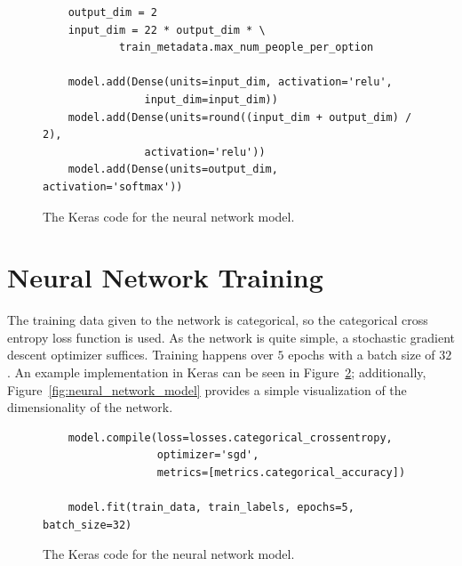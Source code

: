 \documentclass[]{report}
\begin{document}
\begin{figure}[h]
    \centering
    \begin{verbatim}
    output_dim = 2
    input_dim = 22 * output_dim * \
            train_metadata.max_num_people_per_option

    model.add(Dense(units=input_dim, activation='relu',
                input_dim=input_dim))
    model.add(Dense(units=round((input_dim + output_dim) / 2),
                activation='relu'))
    model.add(Dense(units=output_dim, activation='softmax'))
    \end{verbatim}
    \caption{The Keras code for the neural network model.}
    \label{fig:code_for_model}
\end{figure}

\FloatBarrier
\section{Neural Network Training}

The training data given to the network is categorical, so the categorical cross entropy loss
function is used. As the network is quite simple, a stochastic gradient descent optimizer suffices.
Training happens over $5$ epochs with a batch size of $32$. An example implementation in Keras can
be seen in Figure~\ref{fig:code_for_training}; additionally, Figure~\ref{fig:neural_network_model}
provides a simple visualization of the dimensionality of the network.

\begin{figure}[h]
    \centering
    \begin{verbatim}
    model.compile(loss=losses.categorical_crossentropy,
                  optimizer='sgd',
                  metrics=[metrics.categorical_accuracy])
    
    model.fit(train_data, train_labels, epochs=5, batch_size=32)
    \end{verbatim}
    \caption{The Keras code for the neural network model.}
    \label{fig:code_for_training}
\end{figure}
\end{document}
